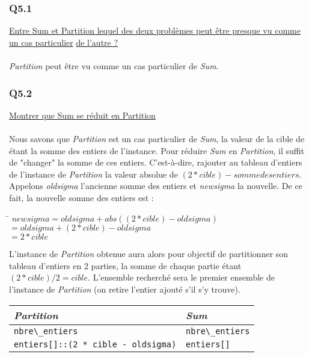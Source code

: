 \subsubsection{Q5.1}

\underline{Entre Sum et Partition lequel des deux problèmes peut être presque vu comme un cas particulier}
\underline{de l'autre ?}
~\\~\\
\textit{Partition} peut être vu comme un cas particulier de \textit{Sum}.

\subsubsection{Q5.2}

\underline{Montrer que Sum se réduit en Partition}
~\\~\\
Nous savons que \textit{Partition} est un cas particulier de \textit{Sum}, la valeur de la cible de étant la somme des entiers de l'instance. Pour réduire \textit{Sum} en \textit{Partition}, il suffit de "changer" la somme de ces entiers. C'est-à-dire, rajouter au tableau d'entiers de l'instance de \textit{Partition} la valeur absolue de $(2 * cible) - somme des entiers$.\\ Appelons \textit{oldsigma} l'ancienne somme des entiers et \textit{newsigma} la nouvelle. De ce fait, la nouvelle somme des entiers est :
\begin{tabbing}
	\hspace{2cm}\=\kill
	$newsigma = oldsigma + abs ((2 * cible) - oldsigma)$\\
	\>$	= oldsigma + (2 * cible) - oldsigma$\\
	\>$ = 2 * cible$
\end{tabbing}

L'instance de \textit{Partition} obtenue aura alors pour objectif de partitionner son tableau d'entiers en 2 parties, la somme de chaque partie étant $(2 * cible) / 2 = cible.$ L'ensemble recherché sera le premier ensemble de l'instance de \textit{Partition} (on retire l'entier ajouté s'il s'y trouve).\\

\begin{tabular}{|l|l|}
  \hline
  \textit{Partition} & \textit{Sum}\\
  \hline
  \verb+nbre\_entiers+ & \verb+nbre\_entiers+ \\
  \hline
  \verb+entiers[]::(2 * cible - oldsigma)+ & \verb+entiers[]+ \\
  \hline
\end{tabular}

